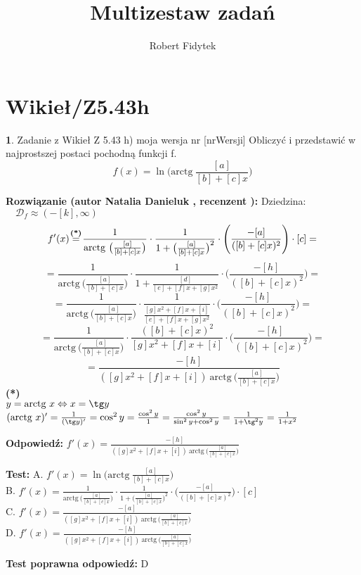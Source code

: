 \documentclass[12pt, a4paper]{article}
\title{Multizestaw zadań}
\author{Robert Fidytek}
\date{}
\theoremstyle{definition} %
\newtheorem{zad}{}
\newcommand{\kategoria}[1]{\section{#1}} %
\newcommand{\zadStart}[1]{\begin{zad}#1\newline} %
\newcommand{\zadStop}{\end{zad}}   %
\newcommand{\rozwStart}[2]{\noindent \textbf{Rozwiązanie (autor #1 , recenzent #2): }\newline} %
\newcommand{\rozwStop}{\newline}                                            %
\newcommand{\odpStart}{\noindent \textbf{Odpowiedź:}\newline}    %
\newcommand{\odpStop}{\newline}                                             %
\newcommand{\testStart}{\noindent \textbf{Test:}\newline} %
\newcommand{\testStop}{\newline} %
\newcommand{\kluczStart}{\noindent \textbf{Test poprawna odpowiedź:}\newline} %
\newcommand{\kluczStop}{\newline} %
\begin{document}
\maketitle

\kategoria{Wikieł/Z5.43h}

\zadStart{Zadanie z Wikieł Z 5.43 h) moja wersja nr [nrWersji]}
Obliczyć i przedstawić w najprostszej postaci pochodną funkcji f.
$$f(x) = \ln \Big(\text{arctg}\ \frac{[a]}{[b]+[c]x}\Big)$$
\zadStop

\rozwStart{Natalia Danieluk}{}
Dziedzina: $\quad \mathcal{D}_f\approx(-[k],\infty)$
$$f'(x) \mathrel{\stackrel{\makebox[0pt]{\mbox{\normalfont\scriptsize\textbf{(*)}}}}{=}}
\frac{1}{\text{arctg}\ \big(\frac{[a]}{[b]+[c]x}\big)} \cdot \frac{1}{1+\big(\frac{[a]}{[b]+[c]x}\big)^2} \cdot \Bigg(\frac{-[a]}{([b]+[c]x)^2}\Bigg) \cdot [c] =$$
$$= \frac{1}{\text{arctg}\ \big(\frac{[a]}{[b]+[c]x}\big)} \cdot \frac{1}{1+\frac{[d]}{[e]+[f]x+[g]x^2}} \cdot \Bigg(\frac{-[h]}{([b]+[c]x)^2}\Bigg) =$$
$$= \frac{1}{\text{arctg}\ \big(\frac{[a]}{[b]+[c]x}\big)} \cdot \frac{1}{\frac{[g]x^2+[f]x+[i]}{[e]+[f]x+[g]x^2}} \cdot \Bigg(\frac{-[h]}{([b]+[c]x)^2}\Bigg) =$$
$$= \frac{1}{\text{arctg}\ \big(\frac{[a]}{[b]+[c]x}\big)} \cdot \frac{([b]+[c]x)^2}{[g]x^2+[f]x+[i]} \cdot \Bigg(\frac{-[h]}{([b]+[c]x)^2}\Bigg) =$$
$$= \frac{-[h]}{([g]x^2+[f]x+[i])\ \text{arctg}\ \big(\frac{[a]}{[b]+[c]x}\big)}$$
{\normalfont\scriptsize\textbf{(*)}\\
$y = \text{arctg}\ x \Leftrightarrow x = \tg y$\\
$(\text{arctg}\ x)' = \frac{1}{(\tg y)'} = \cos^2y = \frac{\cos^2y}{1} = \frac{\cos^2y}{\sin^2y + \cos^2y} = \frac{1}{1 + \tg^2y}= \frac{1}{1 + x^2}$}
\rozwStop

\odpStart
$f'(x) = \frac{-[h]}{([g]x^2+[f]x+[i])\ \text{arctg}\ \big(\frac{[a]}{[b]+[c]x}\big)}$
\odpStop

\testStart
A. $f'(x) = \ln \Big(\text{arctg}\ \frac{[a]}{[b]+[c]x}\Big)$\\
B. $f'(x) = \frac{1}{\text{arctg}\ \big(\frac{[a]}{[b]+[c]x}\big)} \cdot \frac{1}{1+\big(\frac{[a]}{[b]+[c]x}\big)^2} \cdot \Bigg(\frac{-[a]}{([b]+[c]x)^2}\Bigg) \cdot [c]$\\
C. $f'(x) = \frac{-[a]}{([g]x^2+[f]x+[i])\ \text{arctg}\ \big(\frac{[a]}{[b]+[c]x}\big)}$\\
D. $f'(x) = \frac{-[h]}{([g]x^2+[f]x+[i])\ \text{arctg}\ \big(\frac{[a]}{[b]+[c]x}\big)}$
\testStop

\kluczStart
D
\kluczStop
\end{document}
